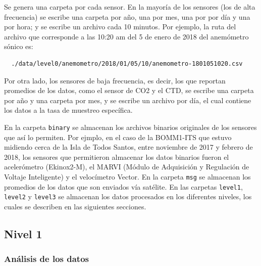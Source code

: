 \documentclass[11pt]{article}
\begin{document}
Se genera una carpeta por cada sensor. En la mayoría de los sensores (los de alta
frecuencia) se escribe una carpeta por año, una por mes, una por por día y una por
hora; y se escribe un archivo cada 10 minutos. Por ejemplo, la ruta del archivo que
corresponde a las 10:20 am del 5 de enero de 2018 del anemómetro sónico es:

\begin{verbatim}
  ./data/level0/anemometro/2018/01/05/10/anemometro-1801051020.csv
\end{verbatim}

Por otra lado, los sensores de baja frecuencia, es decir, los que reportan
promedios de los datos, como el sensor de CO2 y el CTD, se escribe una carpeta
por año y una carpeta por mes, y se escribe un archivo por día, el cual contiene
los datos a la tasa de muestreo específica.

En la carpeta \texttt{binary} se almacenan los archivos binarios originales de
los sensores que así lo permiten. Por ejmplo, en el caso de la BOMM1-ITS que
estuvo midiendo cerca de la Isla de Todos Santos, entre noviembre de 2017 y
febrero de 2018, los sensores que permitieron almacenar los datos binarios
fueron el acelerómetro (Ekinox2-M), el MARVI (Módulo de Adquisición y Regulación
de Voltaje Inteligente) y el velocímetro Vector. En la carpeta \texttt{msg} se
almacenan los promedios de los datos que son enviados vía satélite. En las
carpetas \texttt{level1}, \texttt{level2} y \texttt{level3} se almacenan los
datos procesados en los diferentes niveles, los cuales se describen en las
siguientes secciones.

\subsection{Nivel 1}
\label{sub:nivel_1}

\subsubsection*{Análisis de los datos}
\end{document}
